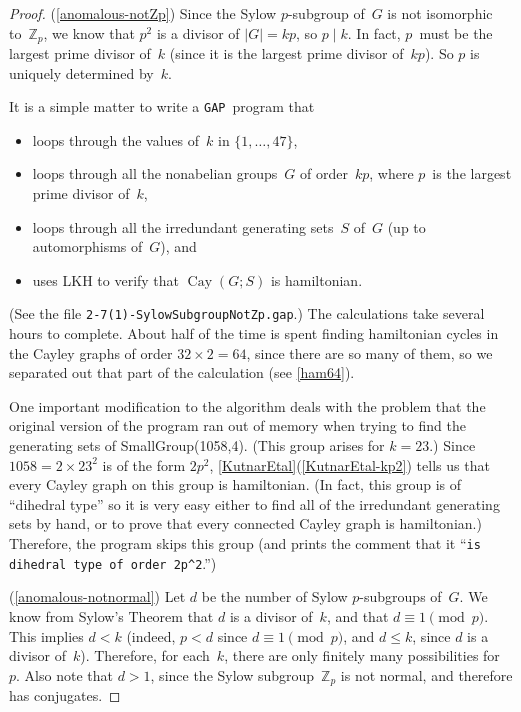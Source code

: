 \documentclass[]{amcjoucc}
\newcommand{\csee}[1]{\textup(see \cref{#1}\textup)}
\newcommand{\pref}[1]{(\ref{#1})}
\newcommand{\fullcref}[2]{\cref{#1}\pref{#1-#2}}
\theoremstyle{plain}
\theoremstyle{definition}
\theoremstyle{definition}
\newenvironment{justification}{\begingroup \renewcommand{\proofname}{Justification}\begin{proof}}{\end{proof}\endgroup}
\DeclareMathOperator{\Cay}{Cay}
\newcommand{\GAP}{\filename{GAP}}
\newcommand{\ZZ}{\mathbb{Z}}
\newcommand{\filename}[1]{\texttt{#1}}
\newcommand{\function}[1]{\textsf{#1}}
\begin{document}
\begin{justification}
\pref{anomalous-notZp}
Since the Sylow $p$-subgroup of~$G$ is not isomorphic to~$\ZZ_p$, we know that $p^2$ is a divisor of $|G| = kp$, so $p \mid k$. In fact, $p$~must be the largest prime divisor of~$k$ (since it is the largest prime divisor of~$kp$). So $p$ is uniquely determined by~$k$. 

It is a simple matter to write a \GAP\ program that
	\begin{itemize}
	\item loops through the values of~$k$ in $\{1,\ldots,47\}$, 
	\item loops through all the nonabelian groups~$G$ of order~$kp$, where $p$~is the largest prime divisor of~$k$, 
	\item loops through all the irredundant generating sets~$S$ of~$G$ (up to automorphisms of~$G$),
	and
	\item uses \function{LKH} to verify that $\Cay(G;S)$ is hamiltonian.
	\end{itemize}
(See the file \filename{2-7(1)-SylowSubgroupNotZp.gap}.) The calculations take several hours to complete. About half of the time is spent finding hamiltonian cycles in the Cayley graphs of order $32 \times 2 = 64$, since there are so many of them, so we separated out that part of the calculation \csee{ham64}. 

One important modification to the algorithm deals with the problem that the original version of the program ran out of memory when trying to find the generating sets of \function{SmallGroup(1058,4)}. (This group arises for $k = 23$.) Since $1058 = 2 \times 23^2$ is of the form $2p^2$, \fullcref{KutnarEtal}{kp2} tells us that every Cayley graph on this group is hamiltonian. (In fact, this group is of ``dihedral type'' so it is very easy either to find all of the irredundant generating sets by hand, or to prove that every connected Cayley graph is hamiltonian.) Therefore, the program skips this group (and prints the comment that it ``\verb|is dihedral type of order 2p^2|\rlap.'')

\medbreak

\pref{anomalous-notnormal} 
Let $d$ be the number of Sylow $p$-subgroups of~$G$. We know from Sylow's Theorem that $d$ is a divisor of~$k$, and that $d \equiv 1 \pmod{p}$. This implies $d < k$ (indeed, $p < d$ since $d \equiv 1 \pmod{p}$, and $d \le k$, since $d$ is a divisor of~$k$). Therefore, for each~$k$, there are only finitely many possibilities for~$p$. Also note that $d > 1$, since the Sylow subgroup~$\ZZ_p$ is not normal, and therefore has conjugates.


\end{justification}
\end{document}
